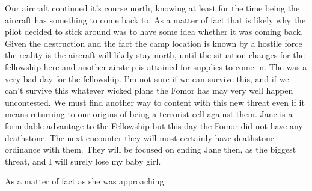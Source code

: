 Our aircraft continued it's course north, knowing at least for the time being the aircraft has something to come back to. As a matter of fact that is likely why the pilot decided to stick around was to have some idea whether it was coming back. Given the destruction and the fact the camp location is known by a hostile force the reality is the aircraft will likely stay north, until the situation changes for the fellowship here and another airstrip is attained for supplies to come in. The was a very bad day for the fellowship. I'm not sure if we can survive this, and if we can't survive this whatever wicked plans the Fomor has may very well happen uncontested. We must find another way to content with this new threat even if it means returning to our origins of being a terrorist cell against them. Jane is a formidable advantage to the Fellowship but this day the Fomor did not have any deathstone. The next encounter they will most certainly have deathstone ordinance with them. They will be focused on ending Jane then, as the biggest threat, and I will surely lose my baby girl.


As a matter of fact as she was approaching


 
